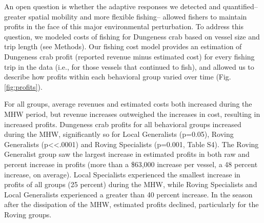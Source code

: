 \documentclass[9pt,twocolumn,twoside,lineno]{pnas-new}
\begin{document}
An open question is whether the adaptive responses we detected and
quantified-- greater spatial mobility and more flexible fishing--
allowed fishers to maintain profits in the face of this major
environmental perturbation. To address this question, we modeled costs
of fishing for Dungeness crab based on vessel size and trip length (see
Methods). Our fishing cost model provides an estimation of Dungeness
crab profit (reported revenue minus estimated cost) for every fishing
trip in the data (i.e., for those vessels that continued to fish), and
allowed us to describe how profits within each behavioral group varied
over time (Fig. \ref{fig:profits}).

For all groups, average revenues and estimated costs both increased
during the MHW period, but revenue increases outweighed the increases in
cost, resulting in increased profits. Dungeness crab profits for all
behavioral groups increased during the MHW, significantly so for Local
Generalists (p=0.05), Roving Generalists (p\textless\textless.0001) and
Roving Specialists (p=0.001, Table S4). The Roving Generalist group saw
the largest increase in estimated profits in both raw and percent
increase in profits (more than a \$63,000 increase per vessel, a 48
percent increase, on average). Local Specialists experienced the
smallest increase in profits of all groups (25 percent) during the MHW,
while Roving Specialists and Local Generalists experienced a greater
than 40 percent increase. In the season after the dissipation of the
MHW, estimated profits declined, particularly for the Roving groups.
\end{document}
